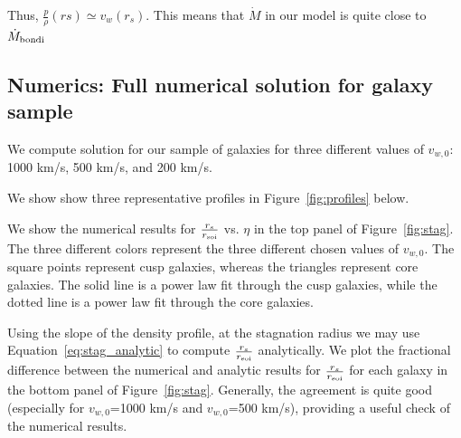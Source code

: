 \documentclass[usenatbib,fleqn]{mn2e}
\newcommand{\Mdotb}{\dot{M}_{\rm bondi}}
\newcommand{\rs}{r_s}
\newcommand{\vw}{v_w}
\newcommand{\cs}{\frac{p}{\rho}}
\newcommand{\soi}{\rm soi}
\newcommand{\rsoi}{r_{\soi}}
\newcommand{\vwO}{v_{w,0}}
\newcommand{\x}{\frac{r_s}{\rsoi}}
\begin{document}
Thus, $\cs(rs)\simeq \vw(\rs)$. This means that $\dot{M}$ in our model is quite close to $\Mdotb$



\subsection{Numerics: Full numerical solution for galaxy sample}
We compute solution for our sample of galaxies for three different values of $v_{w,0}$: 1000 km/s, 500 km/s, and 200 km/s. 

We show show three representative profiles in Figure~\ref{fig:profiles} below. 

We show the numerical results for $\x$ vs. $\eta$ in the top panel of Figure~\ref{fig:stag}.  The three different colors represent the three different chosen values of $\vwO$. The square points represent cusp galaxies, whereas the triangles represent core galaxies.  The solid line is a power law fit through the cusp galaxies, while the dotted line is a power law fit through the core galaxies. 

Using the slope of the density profile, at the stagnation radius we may use Equation~\ref{eq:stag_analytic} to compute $\x$ analytically. We plot the fractional difference between the numerical and analytic results for $\x$ for each galaxy in the bottom panel of Figure~\ref{fig:stag}.  Generally, the agreement is quite good (especially for $\vwO$=1000 km/s and $\vwO$=500 km/s), providing a useful check of the numerical results. 

\end{document}
